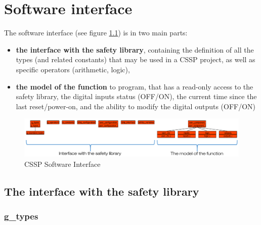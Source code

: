 \chapter{Software interface}

The software interface (see figure \ref{annexes:CSSP-SW-interface}) is in two main parts:
\begin{itemize}
    \item \textbf{the interface with the safety library}, containing the definition of all the types (and related constants) that may be used in a CSSP project, as well as specific operators (arithmetic, logic),
    \item \textbf{the model of the function} to program, that has a read-only access to the safety library, the digital inputs status (OFF/ON), the current time since the last reset/power-on, and the ability to modify the digital outputs (OFF/ON)
\end{itemize}
\begin{figure}[h]
\centering\includegraphics[scale=0.25]{Pictures/chapterAnnexes/sw-interface.png}
\caption{CSSP Software Interface}
\label{annexes:CSSP-SW-interface}
\end{figure}

\section{The interface with the safety library}
\label{annexes:interface-with-safety-library}
\subsection{g\_types}



